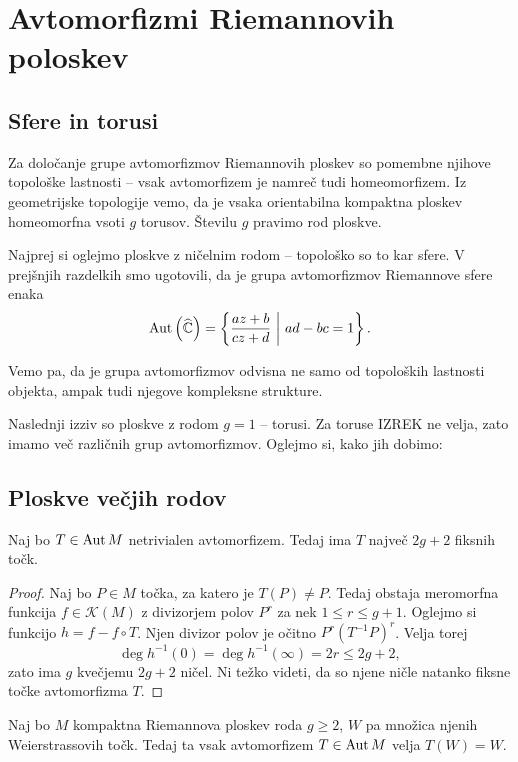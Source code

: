 \section{Avtomorfizmi Riemannovih poloskev}

\subsection{Sfere in torusi}

Za določanje grupe avtomorfizmov Riemannovih ploskev so pomembne
njihove topološke lastnosti -- vsak avtomorfizem je namreč tudi
homeomorfizem. Iz geometrijske topologije vemo, da je vsaka
orientabilna kompaktna ploskev homeomorfna vsoti $g$ torusov.
Številu $g$ pravimo rod ploskve.

Najprej si oglejmo ploskve z ničelnim rodom -- topološko so to kar
sfere. V prejšnjih razdelkih smo ugotovili, da je grupa
avtomorfizmov Riemannove sfere enaka
\[
\operatorname{Aut} \left(\widehat{\mathbb{C}}\right) = \left\{\frac{az + b}{cz + d}~\middle\vert~ad - bc = 1\right\}.
\]

Vemo pa, da je grupa avtomorfizmov odvisna ne samo od topoloških
lastnosti objekta, ampak tudi njegove kompleksne strukture.

Naslednji izziv so ploskve z rodom $g=1$ -- torusi. Za toruse
IZREK ne velja, zato imamo več različnih grup avtomorfizmov.
Oglejmo si, kako jih dobimo:

\subsection{Ploskve večjih rodov}

\begin{trditev}
Naj bo $T \in \operatorname{Aut} M$ netrivialen avtomorfizem. Tedaj ima $T$
največ $2g + 2$ fiksnih točk.
\end{trditev}

\begin{proof}
Naj bo $P \in M$ točka, za katero je $T(P) \ne P$. Tedaj obstaja
meromorfna funkcija $f \in \mathscr{K}(M)$ z divizorjem polov
$P^r$ za nek $1 \leq r \leq g + 1$. Oglejmo si funkcijo
$h = f - f \circ T$. Njen divizor polov je očitno
$P^r (T^{-1}P)^r$. Velja torej
\[
\deg h^{-1}(0) = \deg h^{-1}(\infty) = 2r \leq 2g + 2,
\]
zato ima $g$ kvečjemu $2g + 2$ ničel. Ni težko videti, da so njene
ničle natanko fiksne točke avtomorfizma $T$.
\end{proof}

\begin{lema}
Naj bo $M$ kompaktna Riemannova ploskev roda $g \geq 2$, $W$ pa
množica njenih Weierstrassovih točk. Tedaj ta vsak avtomorfizem
$T \in \operatorname{Aut} M$ velja $T(W) = W$.
\end{lema}

